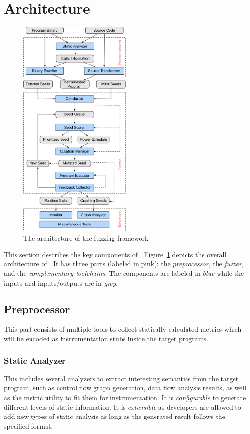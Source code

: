 \section{Architecture}\label{sec:details}

\begin{figure}[t]
	\centering
	\includegraphics[width=0.5\textwidth]{res/fot/FOT_overview}
	\caption{The architecture of the {\FOT} fuzzing framework}
	\label{fig:fot_workflow}
\end{figure}

This section describes the key components of {\FOT}.
Figure~\ref{fig:fot_workflow} depicts the overall architecture of {\FOT}.
It has three parts (labeled in pink): the \emph{preprocessor}, the \emph{fuzzer}, and the \emph{complementary toolchains}.
The components are labeled in \emph{blue} while the inputs and inputs/outputs are in \emph{grey}.


\subsection{Preprocessor}
This part consists of multiple tools to collect statically calculated metrics which will be encoded as instrumentation stubs inside the target programs.


\subsubsection{Static Analyzer}\label{sec:static_analysis}
This includes several analyzers to extract interesting semantics from the target program, such as control flow graph generation, data flow analysis results, as well as the metric utility to fit them for instrumentation.
It is \textit{configurable} to generate different levels of static information. It is \textit{extensible} as developers are allowed to add new types of static analysis as long as the generated result follows the specified format.


